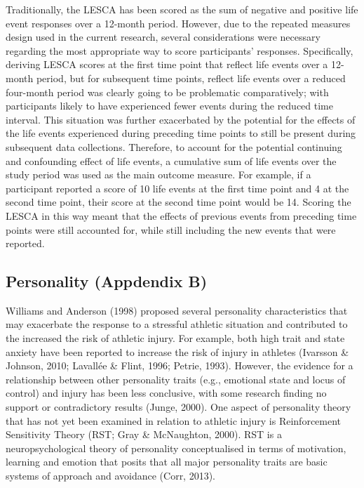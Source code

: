 \documentclass[
  english,
  man,floatsintext]{apa6}
\begin{document}
Traditionally, the LESCA has been scored as the sum of negative and positive life event responses over a 12-month period.
However, due to the repeated measures design used in the current research, several considerations were necessary regarding the most appropriate way to score participants' responses.
Specifically, deriving LESCA scores at the first time point that reflect life events over a 12-month period, but for subsequent time points, reflect life events over a reduced four-month period was clearly going to be problematic comparatively; with participants likely to have experienced fewer events during the reduced time interval.
This situation was further exacerbated by the potential for the effects of the life events experienced during preceding time points to still be present during subsequent data collections.
Therefore, to account for the potential continuing and confounding effect of life events, a cumulative sum of life events over the study period was used as the main outcome measure.
For example, if a participant reported a score of 10 life events at the first time point and 4 at the second time point, their score at the second time point would be 14.
Scoring the LESCA in this way meant that the effects of previous events from preceding time points were still accounted for, while still including the new events that were reported.

\hypertarget{personality-appdendix-b}{%
\subsection{Personality (Appdendix B)}\label{personality-appdendix-b}}

Williams and Anderson (1998) proposed several personality characteristics that may exacerbate the response to a stressful athletic situation and contributed to the increased the risk of athletic injury.
For example, both high trait and state anxiety have been reported to increase the risk of injury in athletes (Ivarsson \& Johnson, 2010; Lavallée \& Flint, 1996; Petrie, 1993).
However, the evidence for a relationship between other personality traits (e.g., emotional state and locus of control) and injury has been less conclusive, with some research finding no support or contradictory results (Junge, 2000).
One aspect of personality theory that has not yet been examined in relation to athletic injury is Reinforcement Sensitivity Theory (RST; Gray \& McNaughton, 2000).
RST is a neuropsychological theory of personality conceptualised in terms of motivation, learning and emotion that posits that all major personality traits are basic systems of approach and avoidance (Corr, 2013).
\end{document}
